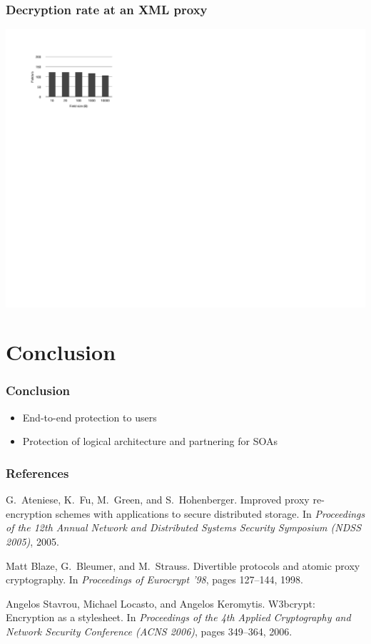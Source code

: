 \documentclass{beamer}
\begin{document}
\begin{frame}
\frametitle{Decryption rate at an XML proxy}
\begin{center}
\includegraphics{server_decrypt} \\
\end{center}
\end{frame}

\section{Conclusion}
\begin{frame}
\frametitle{Conclusion}
\begin{itemize}
\item End-to-end protection to users 
\item Protection of logical architecture and partnering for SOAs
\end{itemize}
\end{frame}

\begin{thebibliography}{10}
\frametitle{References}
G.~Ateniese, K.~Fu, M.~Green, and S.~Hohenberger.
\newblock Improved proxy re-encryption schemes with applications to secure
  distributed storage.
\newblock In {\em Proceedings of the 12th Annual Network and Distributed
  Systems Security Symposium (NDSS 2005)}, 2005.

Matt Blaze, G.~Bleumer, and M.~Strauss.
\newblock Divertible protocols and atomic proxy cryptography.
\newblock In {\em Proceedings of Eurocrypt '98}, pages 127--144, 1998.

Angelos Stavrou, Michael Locasto, and Angelos Keromytis.
\newblock W3bcrypt: Encryption as a stylesheet.
\newblock In {\em Proceedings of the 4th Applied Cryptography and Network
  Security Conference (ACNS 2006)}, pages 349--364, 2006.

\end{thebibliography}
\end{document}

